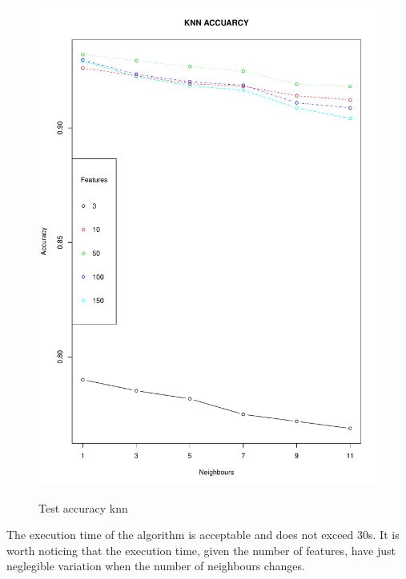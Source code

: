 \documentclass{article}
\begin{document}
\begin{figure}[H]
\begin{adjustwidth}{-4cm}{-4cm}
{    \includegraphics[scale=0.35]{../knn_accuracy_rgb.pdf}  
     }
     \centering
     \caption{Test accuracy knn}  \label{knnaccuracy}
      \end{adjustwidth}
   \end{figure}
   
\noindent The execution time of the algorithm is acceptable and does not exceed 30s. It is worth noticing that the execution time, given the number of features, have just neglegible variation when the number of neighbours changes.\\
\end{document}
